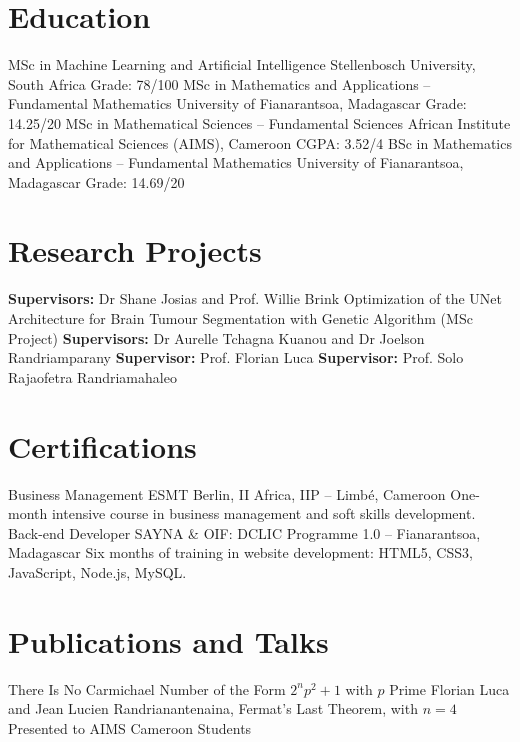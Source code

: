 \documentclass[a4paper,oneside]{article}
\begin{document}
	\section{Education}
	{MSc in Machine Learning and Artificial Intelligence}
	{Stellenbosch University, South Africa}
	{Grade: 78/100}
	{MSc in Mathematics and Applications -- Fundamental Mathematics}
	{University of Fianarantsoa, Madagascar}
	{Grade: 14.25/20}
	{MSc in Mathematical Sciences -- Fundamental Sciences}
	{African Institute for Mathematical Sciences (AIMS), Cameroon}
	{CGPA: 3.52/4}
	{BSc in Mathematics and Applications -- Fundamental Mathematics}
	{University of Fianarantsoa, Madagascar}
	{Grade: 14.69/20}

	\section{Research Projects}
	{}
	{}{\textbf{Supervisors:} Dr Shane Josias and Prof. Willie Brink}
	{Optimization of the UNet Architecture for Brain Tumour Segmentation with Genetic Algorithm (MSc Project)}{}
	{\textbf{Supervisors:} Dr Aurelle Tchagna Kuanou and Dr Joelson Randriamparany}
	{}
	{}{\textbf{Supervisor:} Prof. Florian Luca}
	{}
	{}{\textbf{Supervisor:} Prof. Solo Rajaofetra Randriamahaleo}

	\section{Certifications}
	{Business Management}
	{ESMT Berlin, II Africa, IIP -- Limbé, Cameroon}
	{One-month intensive course in business management and soft skills development.}
	{Back-end Developer}
	{SAYNA \& OIF: DCLIC Programme 1.0 -- Fianarantsoa, Madagascar}
	{Six months of training in website development: HTML5, CSS3, JavaScript, Node.js, MySQL.}

	\section{Publications and Talks}
	{There Is No Carmichael Number of the Form $2^np^2+1$ with $p$ Prime}
	{Florian Luca and Jean Lucien Randrianantenaina, }
	{}
	{Fermat's Last Theorem, with $n=4$}
	{Presented to AIMS Cameroon Students}
	{}
\end{document}
